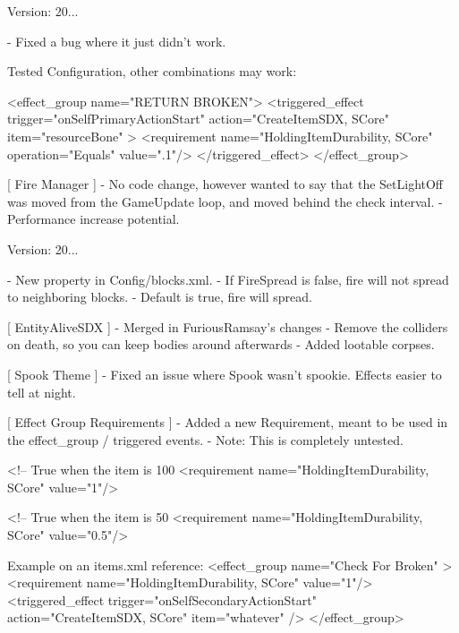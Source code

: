 Version\+: 20... \begin{DoxyVerb}
    - Fixed a bug where it just didn't work.

    Tested Configuration, other combinations may work:

        <effect_group name="RETURN BROKEN">
            <triggered_effect trigger="onSelfPrimaryActionStart" action="CreateItemSDX, SCore" item="resourceBone" >
                <requirement name="HoldingItemDurability, SCore" operation="Equals" value=".1"/>
            </triggered_effect>
        </effect_group>

[ Fire Manager ]
    - No code change, however wanted to say that the SetLightOff was moved from the GameUpdate loop, and moved behind the check interval.
    - Performance increase potential.
\end{DoxyVerb}
 Version\+: 20... \begin{DoxyVerb}
    - New property in Config/blocks.xml.
    - If FireSpread is false, fire will not spread to neighboring blocks.
    - Default is true, fire will spread.

[ EntityAliveSDX ]
    - Merged in FuriousRamsay's changes
        - Remove the colliders on death, so you can keep bodies around afterwards
        - Added lootable corpses.

[ Spook Theme ]
    - Fixed an issue where Spook wasn't spookie. Effects easier to tell at night.


[ Effect Group Requirements ]
    - Added a new Requirement, meant to be used in the effect_group / triggered events.
    - Note: This is completely untested.

        <!-- True when the item is 100%
        <requirement name="HoldingItemDurability, SCore" value="1"/>

        <!-- True when the item is 50%
        <requirement name="HoldingItemDurability, SCore" value="0.5"/>

    Example on an items.xml reference:
        <effect_group name="Check For Broken" >
            <requirement name="HoldingItemDurability, SCore" value="1"/>
            <triggered_effect trigger="onSelfSecondaryActionStart" action="CreateItemSDX, SCore" item="whatever" />
        </effect_group>
\end{DoxyVerb}



